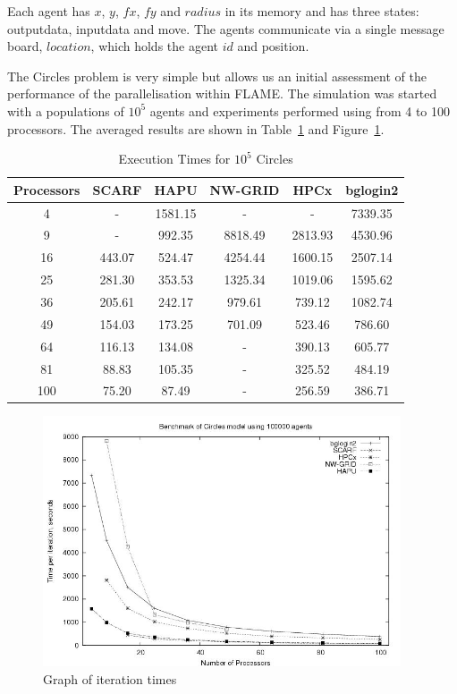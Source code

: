 Each agent has $x$, $y$, $fx$, $fy$ and $radius$ in its memory and has three states: outputdata, inputdata and move. The agents communicate via a single message board, $location$, which holds the agent $id$ and position.

The Circles problem is very simple but allows us an initial assessment of the performance of the parallelisation within FLAME. The simulation was started with a populations of $10^5$  agents and experiments performed using from 4 to 100 processors. The averaged results are shown in Table~\ref{tab:ExecutionTimesForCircles} and Figure~\ref{fig:Circles-graph}.
{
\renewcommand{\arraystretch}{1.25}
\begin{table}[ht]
 \centering
  \begin{tabular}{c|ccccc}
 Processors &SCARF  &HAPU  &NW-GRID &HPCx  &bglogin2 \\ \hline
4 &- &1581.15 &- &- &7339.35    \\
9 &- &992.35 &8818.49 &2813.93 &4530.96 \\
16 &443.07 &524.47 &4254.44 &1600.15 &2507.14   \\
25 &281.30 &353.53 &1325.34 &1019.06 &1595.62   \\
36 &205.61 &242.17 &979.61 &739.12 &1082.74     \\
49 &154.03 &173.25 &701.09 &523.46 &786.60      \\
64 &116.13 &134.08 &- &390.13 &605.77   \\
81 &88.83 &105.35 &- &325.52 &484.19    \\
100 &75.20 &87.49 &- &256.59 &386.71    \\
 
 \end{tabular}
 \caption{Execution Times for $10^5$ Circles}
 \label{tab:ExecutionTimesForCircles}
\end{table}
}
\begin{figure}[ht]
 \centering
  \includegraphics[width=300pt]{Circles-graph.jpg}
 \caption{Graph of iteration times}
 \label{fig:Circles-graph}
\end{figure}

